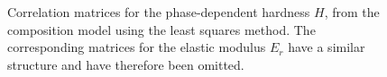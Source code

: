 \begin{figure}[h!]

    \caption{
        Correlation matrices for the phase-dependent hardness $H$, from the composition model using the least squares method.
        The corresponding matrices for the elastic modulus $E_r$ have a similar structure and have therefore been omitted.  \cite{kleiner.2026d}
    }
    \label{fig:cor_ni_fit}
\end{figure}

